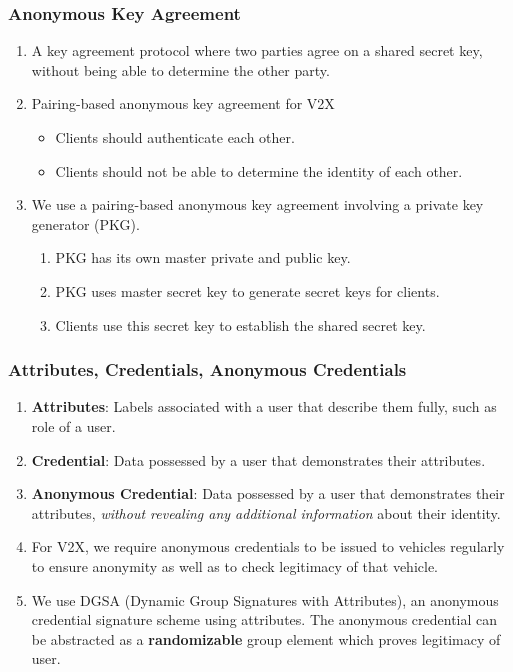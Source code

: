\documentclass{beamer}
\begin{document}
    \begin{frame}
        \frametitle{Anonymous Key Agreement}
        \begin{enumerate}
            \item<1-> A key agreement protocol where two parties agree on a
            shared secret key, without being able to determine the other party.
            \item<2-> Pairing-based anonymous key agreement for V2X
            \begin{itemize}
                \item Clients should authenticate each other.
                \item Clients should not be able to determine the identity of
                each other.
            \end{itemize}
            \item<3-> We use a pairing-based anonymous key agreement involving a
            private key generator (PKG).
            \begin{enumerate}
                \item PKG has its own master private and public key.
                \item PKG uses master secret key to generate secret keys for
                clients.
                \item Clients use this secret key to establish the shared secret
                key.
            \end{enumerate}
        \end{enumerate}
    \end{frame}

    \begin{frame}
        \frametitle{Attributes, Credentials, Anonymous Credentials}
        \begin{enumerate}
            \item<1-> \textbf{Attributes}: Labels associated with a user that
            describe them fully, such as role of a user.
            \item<2-> \textbf{Credential}: Data possessed by a user that
            demonstrates their attributes.
            \item<3-> \textbf{Anonymous Credential}: Data possessed by a user
            that demonstrates their attributes, \emph{without revealing any
            additional information} about their identity.
            \item<4-> For V2X, we require anonymous credentials to be issued to
            vehicles regularly to ensure anonymity as well as to check
            legitimacy of that vehicle.
            \item<5-> We use DGSA (Dynamic Group Signatures with Attributes), an
            anonymous credential signature scheme using attributes. The
            anonymous credential can be abstracted as a \textbf{randomizable}
            group element which proves legitimacy of user.
        \end{enumerate}
    \end{frame}
\end{document}
